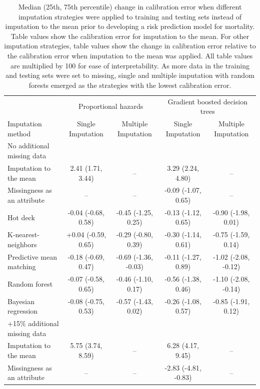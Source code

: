 \documentclass{article}
\begin{document}
\begin{table} 
 \caption{Median (25th, 75th percentile) change in calibration error when different imputation strategies were applied to training and testing sets instead of imputation to the mean prior to developing a risk prediction model for mortality. Table values show the calibration error for imputation to the mean. For other imputation strategies, table values show the change in calibration error relative to the calibration error when imputation to the mean was applied. All table values are multiplied by 100 for ease of interpretability. As more data in the training and testing sets were set to missing, single and multiple imputation with random forests emerged as the strategies with the lowest calibration error.} 
\label{tbl_md_strat_dead_cal_error} 
 
\begin{tabular}{lcccc}
\toprule
& \multicolumn{2}{c}{Proportional hazards} & \multicolumn{2}{c}{Gradient boosted decision trees} \\ 
 \cmidrule(lr){2-3}\cmidrule(lr){4-5}
Imputation method & Single Imputation & Multiple Imputation & Single Imputation & Multiple Imputation \\ 
\midrule
\multicolumn{1}{l}{No additional missing data} \\ 
\midrule
Imputation to the mean & 2.41 (1.71, 3.44) & -- & 3.29 (2.24, 4.80) & -- \\ 
Missingness as an attribute & -- & -- & -0.09 (-1.07, 0.65) & -- \\ 
Hot deck & -0.04 (-0.68, 0.58) & -0.45 (-1.25, 0.25) & -0.13 (-1.12, 0.65) & -0.90 (-1.98, 0.01) \\ 
K-nearest-neighbors & +0.04 (-0.59, 0.65) & -0.29 (-0.80, 0.39) & -0.30 (-1.14, 0.61) & -0.75 (-1.59, 0.14) \\ 
Predictive mean matching & -0.18 (-0.69, 0.47) & -0.69 (-1.36, -0.03) & -0.11 (-1.27, 0.89) & -1.02 (-2.08, -0.12) \\ 
Random forest & -0.07 (-0.58, 0.65) & -0.46 (-1.10, 0.17) & -0.56 (-1.38, 0.46) & -1.10 (-2.08, -0.14) \\ 
Bayesian regression & -0.08 (-0.75, 0.53) & -0.57 (-1.43, 0.02) & -0.26 (-1.08, 0.57) & -0.85 (-1.91, 0.12) \\ 
\midrule
\multicolumn{1}{l}{+15\% additional missing data} \\ 
\midrule
Imputation to the mean & 5.75 (3.74, 8.59) & -- & 6.28 (4.17, 9.45) & -- \\ 
Missingness as an attribute & -- & -- & -2.83 (-4.81, -0.83) & -- \\ 

\end{tabular}
\end{table}
\end{document}
